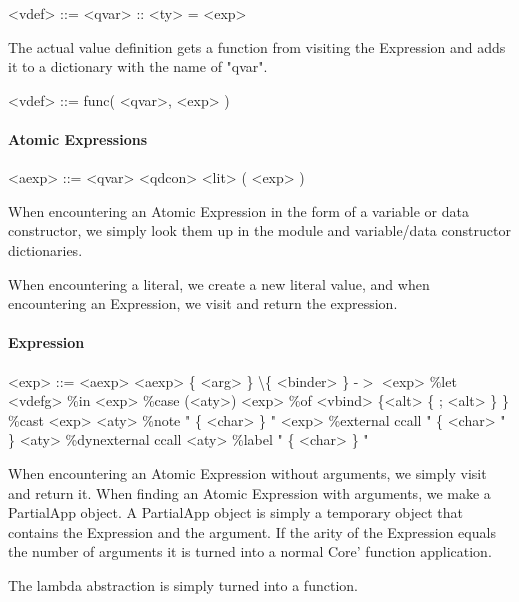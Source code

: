\begin{grammar}
<vdef> ::= <qvar> :: <ty> = <exp>
\end{grammar}

The actual value definition gets a function from visiting the Expression and adds 
it to a dictionary with the name of "qvar".

\begin{grammar}
<vdef> ::= func( <qvar>, <exp> )
\end{grammar}

\paragraph{Atomic Expressions}

\begin{grammar}
<aexp> ::= <qvar>
      \alt <qdcon>
      \alt <lit>
      \alt ( <exp> )
\end{grammar}

When encountering an Atomic Expression in the form of a variable or data constructor, 
we simply look them up in the module and variable/data constructor dictionaries.

When encountering a literal, we create a new literal value, and when encountering an
Expression, we visit and return the expression.

\paragraph{Expression}

\begin{grammar}
<exp> ::= <aexp>
     \alt <aexp> \{ <arg> \}
     \alt \textbackslash \{ <binder> \} -$>$ <exp>
     \alt \%let <vdefg> \%in <exp>
     \alt \%case (<aty>) <exp> \%of <vbind> \{<alt> \{ ; <alt> \}  \}
     \alt \%cast <exp> <aty>
     \alt \%note " \{ <char> \} " <exp>
     \alt \%external ccall " \{ <char> " \} <aty>
     \alt \%dynexternal ccall <aty>
     \alt \%label " \{ <char> \} "
\end{grammar}

When encountering an Atomic Expression without arguments, we simply visit and return
it. When finding an Atomic Expression with arguments, we make a PartialApp object.
A PartialApp object is simply a temporary object that contains the Expression and the
argument. If the arity of the Expression equals the number of arguments it is turned
into a normal Core' function application.

The lambda abstraction is simply turned into a function.

